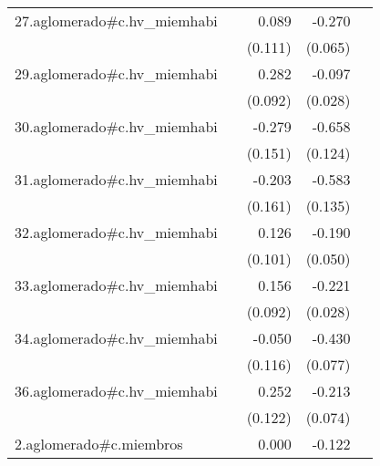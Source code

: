 {\begin{longtable}{l*{4}{D{.}{.}{-1}}}
\addlinespace
27.aglomerado#c.hv\_miemhabi&                     &       0.089         &      -0.270\sym{***}&                     \\
            &                     &     (0.111)         &     (0.065)         &                     \\
\addlinespace
29.aglomerado#c.hv\_miemhabi&                     &       0.282\sym{**} &      -0.097\sym{***}&                     \\
            &                     &     (0.092)         &     (0.028)         &                     \\
\addlinespace
30.aglomerado#c.hv\_miemhabi&                     &      -0.279         &      -0.658\sym{***}&                     \\
            &                     &     (0.151)         &     (0.124)         &                     \\
\addlinespace
31.aglomerado#c.hv\_miemhabi&                     &      -0.203         &      -0.583\sym{***}&                     \\
            &                     &     (0.161)         &     (0.135)         &                     \\
\addlinespace
32.aglomerado#c.hv\_miemhabi&                     &       0.126         &      -0.190\sym{***}&                     \\
            &                     &     (0.101)         &     (0.050)         &                     \\
\addlinespace
33.aglomerado#c.hv\_miemhabi&                     &       0.156         &      -0.221\sym{***}&                     \\
            &                     &     (0.092)         &     (0.028)         &                     \\
\addlinespace
34.aglomerado#c.hv\_miemhabi&                     &      -0.050         &      -0.430\sym{***}&                     \\
            &                     &     (0.116)         &     (0.077)         &                     \\
\addlinespace
36.aglomerado#c.hv\_miemhabi&                     &       0.252\sym{*}  &      -0.213\sym{**} &                     \\
            &                     &     (0.122)         &     (0.074)         &                     \\
\addlinespace
2.aglomerado#c.miembros&                     &       0.000         &      -0.122\sym{***}&                     \\

\end{longtable}}
